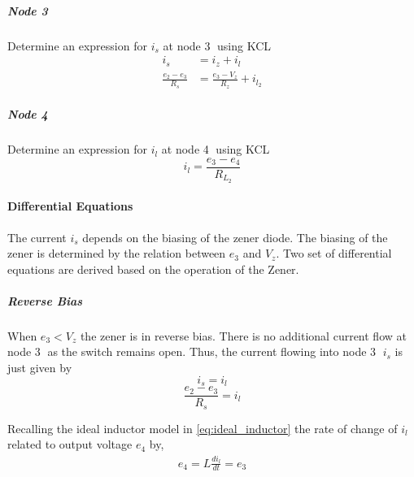 \subparagraph{Node \textcircled{3}}
Determine an expression for $i_s$ at node \textcircled{3} using KCL
\begin{equation}
	\begin{split}
		i_s &= i_z + i_l \\
		\frac{e_2 - e_3}{R_s} &= \frac{e_3 - V_z}{R_z} + i_{l_2}
	\end{split}
	\label{eq:inductiveLoad_node3}
\end{equation}

\subparagraph{Node \textcircled{4}}
Determine an expression for $i_l$ at node \textcircled{4} using KCL
\begin{equation}
	i_l = \frac{e_3 - e_4}{R_{L_2}}
	\label{eq:inductiveLoad_node4}
\end{equation}
\paragraph{Differential Equations}
The current $i_s$ depends on the biasing of the zener diode. The biasing of the zener is determined by the relation between $e_3$ and $V_z$. Two set of differential equations are derived based on the operation of the Zener.

\subparagraph{Reverse Bias}
When $e_3 < V_z$ the zener is in reverse bias. There is no additional current flow at node \textcircled{3} as the switch remains open. Thus, the current flowing into node \textcircled{3} $i_s$ is just given by $$i_s = i_l$$
\begin{equation}
	\frac{e_2 - e_3}{R_s} = i_l
	\label{eq:inductiveload_il}
\end{equation}

Recalling the ideal inductor model in \eqref{eq:ideal_inductor} the rate of change of $i_{l}$ related to output voltage $e_4$ by,
\begin{equation}
	\begin{split}
		e_4 = L\frac{di_l}{dt} = e_3
	\end{split}
	\label{eq:inductiveLoad_output}
\end{equation}

